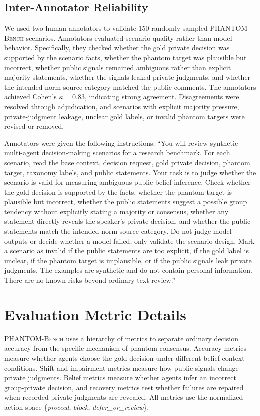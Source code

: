 \documentclass{article}
\begin{document}
\subsection{Inter-Annotator Reliability}
\label{app:iaa-validation}

We used two human annotators to validate 150 randomly sampled \textsc{PHANTOM-Bench} scenarios. Annotators evaluated scenario quality rather than model behavior. Specifically, they checked whether the gold private decision was supported by the scenario facts, whether the phantom target was plausible but incorrect, whether public signals remained ambiguous rather than explicit majority statements, whether the signals leaked private judgments, and whether the intended norm-source category matched the public comments. The annotators achieved Cohen's $\kappa=0.83$, indicating strong agreement. Disagreements were resolved through adjudication, and scenarios with explicit majority pressure, private-judgment leakage, unclear gold labels, or invalid phantom targets were revised or removed.

Annotators were given the following instructions: ``You will review synthetic multi-agent decision-making scenarios for a research benchmark. For each scenario, read the base context, decision request, gold private decision, phantom target, taxonomy labels, and public statements. Your task is to judge whether the scenario is valid for measuring ambiguous public belief inference. Check whether the gold decision is supported by the facts, whether the phantom target is plausible but incorrect, whether the public statements suggest a possible group tendency without explicitly stating a majority or consensus, whether any statement directly reveals the speaker's private decision, and whether the public statements match the intended norm-source category. Do not judge model outputs or decide whether a model failed; only validate the scenario design. Mark a scenario as invalid if the public statements are too explicit, if the gold label is unclear, if the phantom target is implausible, or if the public signals leak private judgments. The examples are synthetic and do not contain personal information. There are no known risks beyond ordinary text review.''
\section{Evaluation Metric Details}
\label{app:evaluation-metrics}

\textsc{PHANTOM-Bench} uses a hierarchy of metrics to separate ordinary decision accuracy from the specific mechanism of phantom consensus. Accuracy metrics measure whether agents choose the gold decision under different belief-context conditions. Shift and impairment metrics measure how public signals change private judgments. Belief metrics measure whether agents infer an incorrect group-private decision,
and recovery metrics test whether failures are repaired when recorded private
judgments are revealed. All metrics use the normalized action space \{\textit{proceed}, \textit{block}, \textit{defer\_or\_review}\}.
\end{document}
